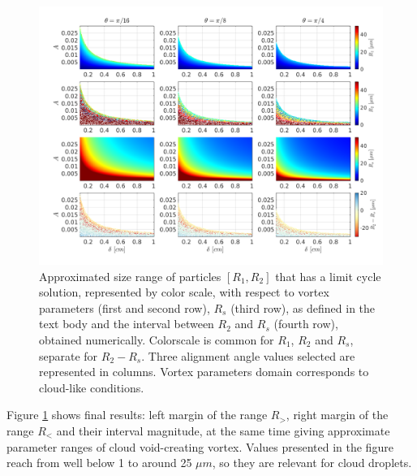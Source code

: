 \documentclass[../main.tex]{subfiles}
\begin{document}
\begin{figure}[h]
\centering
\noindent\includegraphics[width=35pc]{gfx/R1R2Rs.png}
\caption{Approximated size range of particles $[R_1,R_2]$ that has a limit cycle solution, represented by color scale, with respect to vortex parameters (first and second row), $R_s$ (third row), as defined in the text body and the interval between $R_2$ and $R_s$ (fourth row), obtained numerically. Colorscale is common for $R_1$, $R_2$ and $R_s$, separate for $R_2-R_s$. Three alignment angle values selected are represented in columns. Vortex parameters domain corresponds to cloud-like conditions.}
\label{fig:ch4_5}
\end{figure}

Figure \ref{fig:ch4_5} shows final results: left margin of the range $R_>$, right margin of the range $R_<$ and their interval magnitude, at the same time giving approximate parameter ranges of cloud void-creating vortex.
Values presented in the figure reach from well below 1 to around 25 $\mu m$, so they are relevant for cloud droplets.
\end{document}
